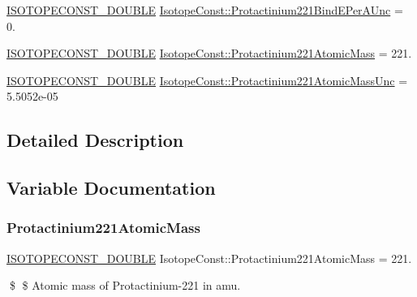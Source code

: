 \begin{DoxyCompactItemize}
\item 
\mbox{\hyperlink{group___isotope_const-_macros_ga8f45a7272ce02c0b4c65c44636ed719a}{I\+S\+O\+T\+O\+P\+E\+C\+O\+N\+S\+T\+\_\+\+D\+O\+U\+B\+LE}} \mbox{\hyperlink{group___isotope_const-_protactinium-_pa221_ga300d66d56a42b04f56bc85f39df2cb3a}{Isotope\+Const\+::\+Protactinium221\+Bind\+E\+Per\+A\+Unc}} = 0.
\item 
\mbox{\hyperlink{group___isotope_const-_macros_ga8f45a7272ce02c0b4c65c44636ed719a}{I\+S\+O\+T\+O\+P\+E\+C\+O\+N\+S\+T\+\_\+\+D\+O\+U\+B\+LE}} \mbox{\hyperlink{group___isotope_const-_protactinium-_pa221_ga55f1824cc725a57c8a811be324de79f2}{Isotope\+Const\+::\+Protactinium221\+Atomic\+Mass}} = 221.
\item 
\mbox{\hyperlink{group___isotope_const-_macros_ga8f45a7272ce02c0b4c65c44636ed719a}{I\+S\+O\+T\+O\+P\+E\+C\+O\+N\+S\+T\+\_\+\+D\+O\+U\+B\+LE}} \mbox{\hyperlink{group___isotope_const-_protactinium-_pa221_gaba6e2c478469e27eda8ff2307fef7b10}{Isotope\+Const\+::\+Protactinium221\+Atomic\+Mass\+Unc}} = 5.\+5052e-\/05
\end{DoxyCompactItemize}


\subsection{Detailed Description}


\subsection{Variable Documentation}
\mbox{\label{group___isotope_const-_protactinium-_pa221_ga55f1824cc725a57c8a811be324de79f2}} 
\subsubsection{\texorpdfstring{Protactinium221\+Atomic\+Mass}{Protactinium221AtomicMass}}
{\footnotesize\ttfamily \mbox{\hyperlink{group___isotope_const-_macros_ga8f45a7272ce02c0b4c65c44636ed719a}{I\+S\+O\+T\+O\+P\+E\+C\+O\+N\+S\+T\+\_\+\+D\+O\+U\+B\+LE}} Isotope\+Const\+::\+Protactinium221\+Atomic\+Mass = 221.}

\$ \$ Atomic mass of Protactinium-\/221 in amu. \mbox{\label{group___isotope_const-_protactinium-_pa221_gaba6e2c478469e27eda8ff2307fef7b10}} 
